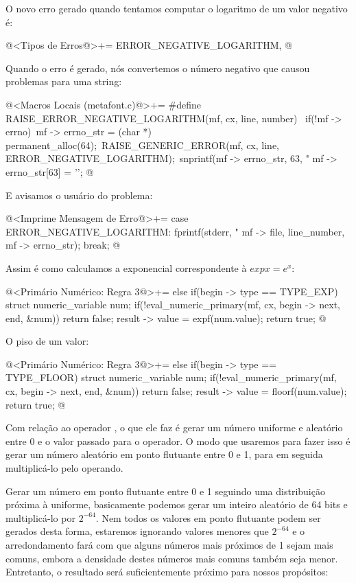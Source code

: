 O novo erro gerado quando tentamos computar o logaritmo de um valor
negativo é:

\iniciocodigo
@<Tipos de Erros@>+=
ERROR_NEGATIVE_LOGARITHM,
@
\fimcodigo

Quando o erro é gerado, nós convertemos o número negativo que causou
problemas para uma string:

\iniciocodigo
@<Macros Locais (metafont.c)@>+=
#define RAISE_ERROR_NEGATIVE_LOGARITHM(mf, cx, line, number) {\
  if(!mf -> errno){\
    mf -> errno_str = (char *) permanent_alloc(64);\
    RAISE_GENERIC_ERROR(mf, cx, line, ERROR_NEGATIVE_LOGARITHM);\
    snprintf(mf -> errno_str, 63, "%
    mf -> errno_str[63] = '\0';}}
@
\fimcodigo

E avisamos o usuário do problema:

\iniciocodigo
@<Imprime Mensagem de Erro@>+=
case ERROR_NEGATIVE_LOGARITHM:
  fprintf(stderr, "%
          mf -> file, line_number, mf -> errno_str);
  break;
@
\fimcodigo

Assim é como calculamos a exponencial correspondente à $exp x = e^x$:

\iniciocodigo
@<Primário Numérico: Regra 3@>+=
else if(begin -> type == TYPE_EXP){
  struct numeric_variable num;
  if(!eval_numeric_primary(mf, cx, begin -> next, end, &num))
    return false;
  result -> value = expf(num.value);
  return true;
}
@
\fimcodigo

O piso de um valor:

\iniciocodigo
@<Primário Numérico: Regra 3@>+=
else if(begin -> type == TYPE_FLOOR){
  struct numeric_variable num;
  if(!eval_numeric_primary(mf, cx, begin -> next, end, &num))
    return false;
  result -> value = floorf(num.value);
  return true;
}
@
\fimcodigo

Com relação ao operador , o que ele faz é
gerar um número uniforme e aleatório entre 0 e o valor passado para o
operador. O modo que usaremos para fazer isso é gerar um número
aleatório em ponto flutuante entre 0 e 1, para em seguida
multiplicá-lo pelo operando.

Gerar um número em ponto flutuante entre 0 e 1 seguindo uma
distribuição próxima à uniforme, basicamente podemos gerar um inteiro
aleatório de 64 bits e multiplicá-lo por $2^{-64}$. Nem todos os valores
em ponto flutuante podem ser gerados desta forma, estaremos ignorando
valores menores que $2^{-64}$ e o arredondamento fará com que alguns
números mais próximos de 1 sejam mais comuns, embora a densidade
destes números mais comuns também seja menor. Entretanto, o resultado
será suficientemente próximo para nossos propósitos:

